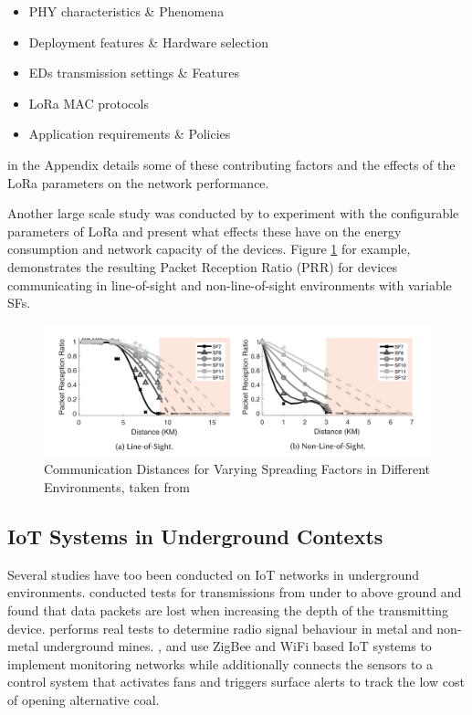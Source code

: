 \documentclass[a4paper,twoside,12pt]{report}
\begin{document}
\begin{itemize}
    \item PHY characteristics \& Phenomena
    \item Deployment features \& Hardware selection
    \item EDs transmission settings \& Features
    \item LoRa MAC protocols
    \item Application requirements \& Policies
\end{itemize}

 in the Appendix details some of these contributing factors and the effects of the LoRa parameters on the network performance.
\newline

Another large scale study was conducted by \cite{Liando2019KnownStudy} to experiment with the configurable parameters of LoRa and present what effects these have on the energy consumption and network capacity of the devices. Figure \ref{fig:LoRaTransmissionSpectogram} for example, demonstrates the resulting Packet Reception Ratio (PRR) for devices communicating in line-of-sight and non-line-of-sight environments with variable SFs.

\begin{figure}[ht]
	\centering
	\includegraphics[width=0.8\linewidth]{images/LoRa_propagation_line_of_sight.png}
	\caption{Communication Distances for Varying Spreading Factors in Different Environments, taken from \cite{Liando2019KnownStudy}}
	\label{fig:LoRaTransmissionSpectogram}
\end{figure}


\subsection{IoT Systems in Underground Contexts}
Several studies have too been conducted on IoT networks in underground environments. \cite{Villarim2022EvaluationApplications} conducted tests for transmissions from under to above ground and found that data packets are lost when increasing the depth of the transmitting device. \cite{Ranjan2018DeepSense:Workings} performs real tests to determine radio signal behaviour in metal and non-metal underground mines. \cite{Jo_Khan_2018}, \cite{Zhu2019MonitoringNetwork} and \cite{Ali2022ImprovingSystem} use ZigBee and WiFi based IoT systems to implement monitoring networks while \cite{Ali2022ImprovingSystem} additionally connects the sensors to a control system that activates fans and triggers surface alerts to track the low cost of opening alternative coal.
\newline
\end{document}
